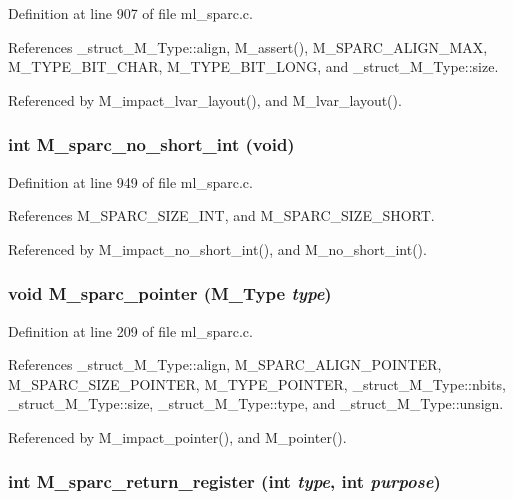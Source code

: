 Definition at line 907 of file ml\_\-sparc.c.

References \_\-struct\_\-M\_\-Type::align, M\_\-assert(), M\_\-SPARC\_\-ALIGN\_\-MAX, M\_\-TYPE\_\-BIT\_\-CHAR, M\_\-TYPE\_\-BIT\_\-LONG, and \_\-struct\_\-M\_\-Type::size.

Referenced by M\_\-impact\_\-lvar\_\-layout(), and M\_\-lvar\_\-layout().
\subsubsection{\setlength{\rightskip}{0pt plus 5cm}int M\_\-sparc\_\-no\_\-short\_\-int (void)}\label{ml__sparc_8c_4dbb77ba9cecee885f6f6d61ecbe9efa}




Definition at line 949 of file ml\_\-sparc.c.

References M\_\-SPARC\_\-SIZE\_\-INT, and M\_\-SPARC\_\-SIZE\_\-SHORT.

Referenced by M\_\-impact\_\-no\_\-short\_\-int(), and M\_\-no\_\-short\_\-int().
\subsubsection{\setlength{\rightskip}{0pt plus 5cm}void M\_\-sparc\_\-pointer (\bf{M\_\-Type} {\em type})}\label{ml__sparc_8c_cba57ec84028af7a5dba2f293b2ee682}




Definition at line 209 of file ml\_\-sparc.c.

References \_\-struct\_\-M\_\-Type::align, M\_\-SPARC\_\-ALIGN\_\-POINTER, M\_\-SPARC\_\-SIZE\_\-POINTER, M\_\-TYPE\_\-POINTER, \_\-struct\_\-M\_\-Type::nbits, \_\-struct\_\-M\_\-Type::size, \_\-struct\_\-M\_\-Type::type, and \_\-struct\_\-M\_\-Type::unsign.

Referenced by M\_\-impact\_\-pointer(), and M\_\-pointer().
\subsubsection{\setlength{\rightskip}{0pt plus 5cm}int M\_\-sparc\_\-return\_\-register (int {\em type}, int {\em purpose})}\label{ml__sparc_8c_2fcf4475e2d7e61a1ef2ae807f28d810}





